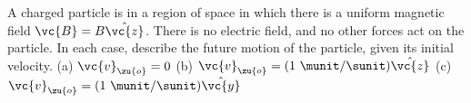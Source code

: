         A charged particle is in a region of space in which there is a uniform magnetic
        field $\vc{B}=B\hat{\vc{z}}$. There is no electric field, and no other forces
        act on the particle. In each case, describe the future motion of the particle,
        given its initial velocity.\hwendpart
        (a) $\vc{v}_\zu{o}=0$\hwendpart
        (b) $\vc{v}_\zu{o}=(1\ \munit/\sunit)\hat{\vc{z}}$\hwendpart
        (c) $\vc{v}_\zu{o}=(1\ \munit/\sunit)\hat{\vc{y}}$
